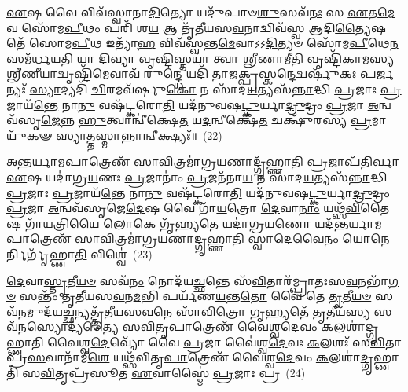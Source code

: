 \-\ul{𑌏}\-𑌷 𑌵𑍈 𑌵𑌿𑌵᳴𑌸𑍍𑌵𑌾𑌨𑌾\-\ul{𑌦𑌿}\-𑌤𑍍𑌯𑍋 𑌯𑌦𑍁᳴𑌪𑌾𑍞\-\ul{𑌶𑍁}\-𑌸𑌵᳴\-\ul{𑌨𑌃} 𑌸 \ul{𑌏}\-𑌤\-\ul{𑌮𑍇}\-𑌵 𑌸𑍋᳴𑌮\-\ul{𑌪𑍀}\-𑌥𑌂 𑌪𑌰𑌿᳴ 𑌶\-\ul{𑌯} 𑌆 𑌤𑍃᳴𑌤𑍀𑌯𑌸\-\ul{𑌵}\-𑌨𑌾𑌦𑍍𑌵𑌿𑌵᳴𑌸𑍍𑌵 𑌆𑌦𑌿\-\ul{𑌤𑍍𑌯𑍈}\-𑌷 𑌤𑍇᳴ 𑌸𑍋𑌮\-\ul{𑌪𑍀}\-𑌥 𑌇𑌤𑍍𑌯𑌾᳴\-\ul{𑌹} 𑌵𑌿𑌵᳴𑌸𑍍𑌵𑌨𑍍𑌤\-\ul{𑌮𑍇}\-𑌵𑌾𑌽𑌽\-\ul{𑌦𑌿}\-𑌤𑍍𑌯𑍞 𑌸𑍋᳴𑌮\-\ul{𑌪𑍀}\-𑌥𑍇\-\ul{𑌨} 𑌸𑌮᳴𑌰𑍍𑌧𑌯\-\ul{𑌤𑌿} 𑌯𑌾 \ul{𑌦𑌿}\-𑌵𑍍𑌯𑌾 𑌵𑍃\-\ul{𑌷𑍍𑌟𑌿}\-𑌸𑍍𑌤𑌯𑌾॑ 𑌤𑍍𑌵𑌾 𑌶𑍍𑌰𑍀\-\ul{𑌣𑌾}\-𑌮𑍀\-\ul{𑌤𑌿} 𑌵𑍃𑌷𑍍𑌟𑌿᳴𑌕𑌾𑌮𑌸𑍍𑌯 𑌶𑍍𑌰𑍀𑌣𑍀\-\ul{𑌯𑌾}\-𑌦𑍍𑌵𑍃𑌷𑍍𑌟𑌿᳴\-\ul{𑌮𑍇}\-𑌵𑌾𑌵᳴ 𑌰𑍁\-\ul{𑌨𑍍𑌦𑍍𑌧𑍇} 𑌯𑌦𑌿᳴ \ul{𑌤𑌾}\-𑌜\-\ul{𑌕𑍍𑌪𑍍𑌰}\-𑌸𑍍𑌕\-\ul{𑌨𑍍𑌦𑍇}\-𑌦𑍍𑌵𑌰𑍍\mbox{}𑌷𑍁᳴𑌕𑌃 \ul{𑌪}\-𑌰𑍍𑌜𑌨𑍍𑌯𑌃᳴ \ul{𑌸𑍍𑌯𑌾}\-𑌦𑍍𑌯𑌦𑌿᳴ \ul{𑌚𑌿}\-𑌰𑌮𑌵᳴𑌰𑍍\mbox{}𑌷𑍁\-\ul{𑌕𑍋} 𑌨 𑌸𑌾᳴𑌦\-\ul{𑌯}\-𑌤𑍍𑌯𑌸᳴\-\ul{𑌨𑍍𑌨𑌾}\-𑌦𑍍𑌧𑌿 \ul{𑌪𑍍𑌰}\-𑌜𑌾𑌃 \ul{𑌪𑍍𑌰}\-𑌜𑌾𑌯᳴\-\ul{𑌨𑍍𑌤𑍇} 𑌨𑌾\-\ul{𑌨𑍁} 𑌵𑌷᳴𑌟𑍍𑌕𑌰𑍋\-\ul{𑌤𑌿} 𑌯𑌦᳴𑌨𑍁𑌵𑌷\-\ul{𑌟𑍍𑌕𑍁}\-॒𑌰𑍍𑌯𑌾\-\ul{𑌦𑍍𑌰𑍁}\-𑌦𑍍𑌰𑌂 \ul{𑌪𑍍𑌰}\-𑌜𑌾 \ul{𑌅}\-𑌨𑍍𑌵𑌵᳴𑌸𑍃\-\ul{𑌜𑍇}\-𑌨𑍍𑌨 \ul{𑌹𑍁}\-𑌤𑍍𑌵𑌾𑌨𑍍𑌵𑍀॑𑌕𑍍𑌷𑍇\-\ul{𑌤} 𑌯\-\ul{𑌦}\-𑌨𑍍𑌵𑍀𑌕𑍍𑌷𑍇᳴\-\ul{𑌤} 𑌚𑌕𑍍𑌷𑍁᳴𑌰𑌸𑍍𑌯 \ul{𑌪𑍍𑌰}\-𑌮𑌾𑌯𑍁᳴𑌕𑍟 \ul{𑌸𑍍𑌯𑌾}\-𑌤𑍍𑌤\-\ul{𑌸𑍍𑌮𑌾}\-𑌨𑍍𑌨𑌾𑌨𑍍𑌵𑍀𑌕𑍍𑌷𑍍𑌯𑌃᳴॥~(22)

{\anuvakamend[{\-\ul{𑌏}\-𑌵 \ul{𑌯}\-𑌜𑍍𑌞𑌾\-\ul{𑌜𑍍𑌜}\-𑌰𑌾\-\ul{𑌯𑍁} 𑌤\-\ul{𑌦𑍇}\-𑌵 𑌤\-\ul{𑌦}\-𑌨𑍍𑌤𑌰𑍍𑌦᳴𑌧𑌾\-\ul{𑌤𑌿} 𑌨 \ul{𑌸}\-𑌪𑍍𑌤𑌵𑌿𑍞᳴𑌶𑌤𑌿𑌶𑍍𑌚}]}%

\-\ul{𑌅}\-\-\ul{𑌨𑍍𑌤}\-\-\ul{𑌰𑍍𑌯𑌾}\-\-\ul{𑌮}\-\-\ul{𑌪𑌾}\-𑌤𑍍𑌰𑍇𑌣᳴ 𑌸𑌾\-\ul{𑌵𑌿}\-𑌤𑍍𑌰𑌮𑌾॑𑌗𑍍𑌰\-\ul{𑌯}\-𑌣𑌾𑌦𑍍𑌗𑍃᳴𑌹𑍍𑌣𑌾𑌤𑌿 \ul{𑌪𑍍𑌰}\-𑌜𑌾𑌪᳴\-\ul{𑌤𑌿}\-𑌰𑍍𑌵𑌾 \ul{𑌏}\-𑌷 𑌯𑌦𑌾॑𑌗𑍍𑌰\-\ul{𑌯}\-𑌣𑌃 \ul{𑌪𑍍𑌰}\-𑌜𑌾𑌨𑌾𑌂॑ \ul{𑌪𑍍𑌰}\-𑌜𑌨᳴𑌨𑌾\-\ul{𑌯} 𑌨 𑌸𑌾᳴𑌦\-\ul{𑌯}\-𑌤𑍍𑌯𑌸᳴\-\ul{𑌨𑍍𑌨𑌾}\-𑌦𑍍𑌧𑌿 \ul{𑌪𑍍𑌰}\-𑌜𑌾𑌃 \ul{𑌪𑍍𑌰}\-𑌜𑌾𑌯᳴\-\ul{𑌨𑍍𑌤𑍇} 𑌨𑌾\-\ul{𑌨𑍁} 𑌵𑌷᳴𑌟𑍍𑌕𑌰𑍋\-\ul{𑌤𑌿} 𑌯𑌦᳴𑌨𑍁𑌵𑌷\-\ul{𑌟𑍍𑌕𑍁}\-𑌰𑍍𑌯𑌾\-\ul{𑌦𑍍𑌰𑍁}\-𑌦𑍍𑌰𑌂 \ul{𑌪𑍍𑌰}\-𑌜𑌾 \ul{𑌅}\-𑌨𑍍𑌵𑌵᳴𑌸𑍃𑌜𑍇\-\ul{𑌦𑍇}\-𑌷 𑌵𑍈 𑌗𑌾᳴\-\ul{𑌯}\-𑌤𑍍𑌰𑍋 \ul{𑌦𑍇}\-𑌵𑌾\-\ul{𑌨𑌾𑌂} 𑌯𑌥𑍍𑌸᳴\-\ul{𑌵𑌿}\-𑌤𑍈𑌷 𑌗𑌾᳴𑌯\-\ul{𑌤𑍍𑌰𑌿}\-𑌯𑍈 \ul{𑌲𑍋}\-𑌕𑍇 𑌗𑍃᳴𑌹𑍍𑌯\-\ul{𑌤𑍇} 𑌯𑌦𑌾॑𑌗𑍍𑌰\-\ul{𑌯}\-𑌣𑍋 𑌯𑌦᳴𑌨𑍍𑌤𑌰𑍍𑌯𑌾𑌮\-\ul{𑌪𑌾}\-𑌤𑍍𑌰𑍇𑌣᳴ 𑌸𑌾\-\ul{𑌵𑌿}\-𑌤𑍍𑌰𑌮𑌾॑𑌗𑍍𑌰\-\ul{𑌯}\-𑌣𑌾\-\ul{𑌦𑍍𑌗𑍃}\-𑌹𑍍𑌣𑌾\-\ul{𑌤𑌿} 𑌸𑍍𑌵𑌾\-\ul{𑌦𑍇}\-𑌵𑍈\-\ul{𑌨𑌂} 𑌯𑍋\-\ul{𑌨𑍇}\-𑌰𑍍𑌨𑌿𑌰𑍍𑌗𑍃᳴𑌹𑍍𑌣𑌾\-\ul{𑌤𑌿} 𑌵𑌿𑌶𑍍𑌵𑍇॑~(23)

\-\ul{𑌦𑍇}\-𑌵𑌾\-\ul{𑌸𑍍𑌤𑍃}\-𑌤𑍀\-\ul{𑌯}\-\-\ul{𑍞} 𑌸𑌵᳴\-\ul{𑌨𑌂} 𑌨𑍋𑌦᳴𑌯\-\ul{𑌚𑍍𑌛}\-𑌨𑍍𑌤𑍇 𑌸᳴\-\ul{𑌵𑌿}\-𑌤𑌾𑌰᳴𑌮𑍍𑌪𑍍𑌰𑌾𑌤𑌃𑌸\-\ul{𑌵}\-𑌨𑌭𑌾᳴\-\ul{𑌗}\-\-\ul{𑍞} 𑌸𑌨𑍍𑌤𑌂᳴ 𑌤𑍃𑌤𑍀𑌯𑌸\-\ul{𑌵}\-𑌨\-\ul{𑌮}\-𑌭𑌿 𑌪𑌰𑍍𑌯᳴𑌣\-\ul{𑌯}\-𑌨𑍍𑌤\-\ul{𑌤𑍋} 𑌵𑍈 𑌤𑍇 \ul{𑌤𑍃}\-𑌤𑍀\-\ul{𑌯}\-\-\ul{𑍞} 𑌸𑌵᳴\-\ul{𑌨}\-𑌮𑍁𑌦᳴𑌯\-\ul{𑌚𑍍𑌛}\-\-\ul{𑌨𑍍}\-𑌯𑌤𑍍𑌤𑍃᳴𑌤𑍀𑌯𑌸\-\ul{𑌵}\-𑌨𑍇 𑌸𑌾᳴\-\ul{𑌵𑌿}\-𑌤𑍍𑌰𑍋 \ul{𑌗𑍃}\-𑌹𑍍𑌯𑌤𑍇᳴ \ul{𑌤𑍃}\-𑌤𑍀𑌯᳴\-\ul{𑌸𑍍𑌯} 𑌸𑌵᳴\-\ul{𑌨}\-𑌸𑍍𑌯𑍋𑌦𑍍𑌯᳴𑌤𑍍𑌯𑍈 𑌸𑌵𑌿𑌤𑍃\-\ul{𑌪𑌾}\-𑌤𑍍𑌰𑍇𑌣᳴ 𑌵𑍈𑌶𑍍𑌵\-\ul{𑌦𑍇}\-𑌵𑌂 \ul{𑌕}\-𑌲𑌶𑌾॑𑌦𑍍𑌗𑍃𑌹𑍍𑌣𑌾𑌤𑌿 𑌵𑍈𑌶𑍍𑌵\-\ul{𑌦𑍇}\-𑌵𑍍𑌯𑍋᳴ 𑌵𑍈 \ul{𑌪𑍍𑌰}\-𑌜𑌾 𑌵𑍈॑𑌶𑍍𑌵\-\ul{𑌦𑍇}\-𑌵𑌃 \ul{𑌕}\-𑌲𑌶𑌃᳴ 𑌸\-\ul{𑌵𑌿}\-𑌤𑌾 𑌪𑍍𑌰᳴\-\ul{𑌸}\-𑌵𑌾𑌨𑌾᳴𑌮𑍀\-\ul{𑌶𑍇} 𑌯𑌥𑍍𑌸᳴𑌵𑌿𑌤𑍃\-\ul{𑌪𑌾}\-𑌤𑍍𑌰𑍇𑌣᳴ 𑌵𑍈𑌶𑍍𑌵\-\ul{𑌦𑍇}\-𑌵𑌂 \ul{𑌕}\-𑌲𑌶𑌾॑\-\ul{𑌦𑍍𑌗𑍃}\-𑌹𑍍𑌣𑌾𑌤𑌿᳴ 𑌸\-\ul{𑌵𑌿}\-𑌤𑍃𑌪𑍍𑌰᳴𑌸𑍂𑌤 \ul{𑌏}\-𑌵𑌾𑌸𑍍𑌮𑍈॑ \ul{𑌪𑍍𑌰}\-𑌜𑌾𑌃 𑌪𑍍𑌰~(24)

